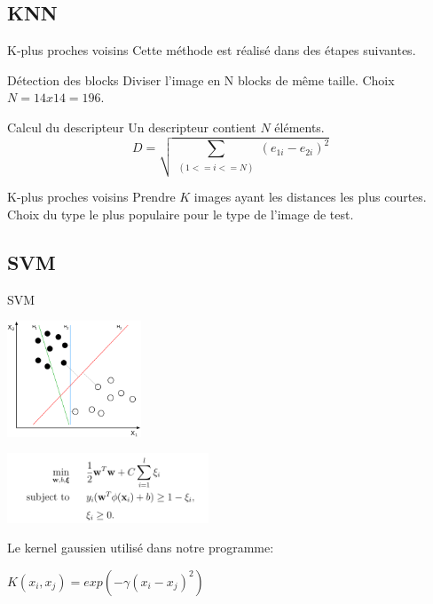 \documentclass[12pt]{beamer}
\begin{document}
\subsection{KNN}
\begin{frame}{K-plus proches voisins}
Cette méthode est réalisé dans des étapes suivantes.
\begin{block}{Détection des blocks}
Diviser l'image en N blocks de même taille. Choix $N = 14x14 = 196$.
\end{block}

\begin{block}{Calcul du descripteur}
Un descripteur contient $N$ éléments. 
\begin{equation}
D = \sqrt{\sum_{\substack{
   	(1<=i<=N)}} (e_{1i} - e_{2i})^2}
\end{equation}
\end{block}

\begin{block}{K-plus proches voisins}
Prendre $K$ images ayant les distances les plus courtes. Choix du type le plus populaire pour le type de l'image de test.
\end{block}
\end{frame}


\subsection{SVM}
\begin{frame}{SVM}
\begin{center}
 \includegraphics[width=4cm]{./images/svmc.png}
\end{center}

\begin{center}
 \includegraphics[width=6cm]{./images/svm.png}
\end{center}

Le kernel gaussien utilisé dans notre programme:
\begin{center}
$K(x_{i}, x_{j}) = exp(-\gamma(x_{i}- x_{j})^2)$
\end{center}
\end{frame}
\end{document}
